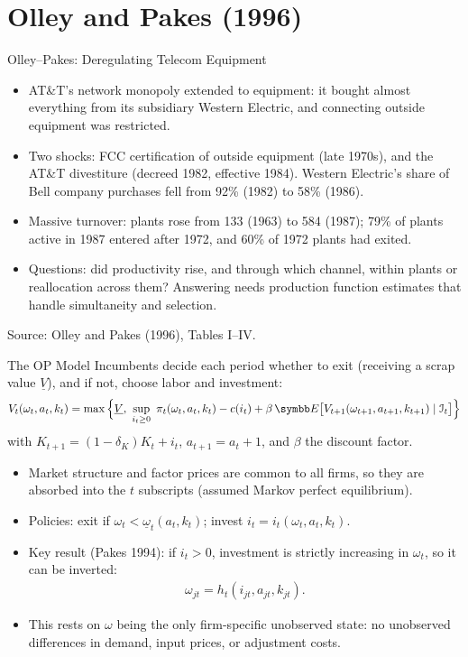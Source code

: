 \documentclass[aspectratio=169,10pt]{beamer}
\begin{document}
\section{Olley and Pakes (1996)}

\begin{frame}{Olley--Pakes: Deregulating Telecom Equipment}
\begin{itemize}
\item AT\&T's network monopoly extended to equipment: it bought almost everything from its subsidiary Western Electric, and connecting outside equipment was restricted.
\item Two shocks: FCC certification of outside equipment (late 1970s), and the AT\&T divestiture (decreed 1982, effective 1984). Western Electric's share of Bell company purchases fell from 92\% (1982) to 58\% (1986).
\item Massive turnover: plants rose from 133 (1963) to 584 (1987); 79\% of plants active in 1987 entered after 1972, and 60\% of 1972 plants had exited.
\item Questions: did productivity rise, and through which channel, within plants or reallocation across them? Answering needs production function estimates that handle \alert{simultaneity} and \alert{selection}.
\end{itemize}
{\footnotesize Source: Olley and Pakes (1996), Tables I--IV.}
\end{frame}


\begin{frame}{The OP Model}
Incumbents decide each period whether to exit (receiving a scrap value $\underline{V}$), and if not, choose labor and investment:
\begin{align*}
V_t(\omega_t, a_t, k_t) = \max\Big\{\underline{V},\ \sup_{i_t \ge 0}\ \pi_t(\omega_t, a_t, k_t) - c(i_t) + \beta\, \E\big[V_{t+1}(\omega_{t+1}, a_{t+1}, k_{t+1}) \mid \mathcal{I}_t\big]\Big\}
\end{align*}
with $K_{t+1} = (1-\delta_K) K_t + i_t$, $a_{t+1} = a_t + 1$, and $\beta$ the discount factor.
\begin{itemize}
\item Market structure and factor prices are common to all firms, so they are absorbed into the $t$ subscripts (assumed Markov perfect equilibrium).
\item Policies: exit if $\omega_t < \underline{\omega}_t(a_t, k_t)$; invest $i_t = i_t(\omega_t, a_t, k_t)$.
\item \alert{Key result} (Pakes 1994): if $i_t > 0$, investment is strictly increasing in $\omega_t$, so it can be inverted:
\begin{align*}
\omega_{jt} = h_t(i_{jt}, a_{jt}, k_{jt}).
\end{align*}
\item This rests on $\omega$ being the \alert{only} firm-specific unobserved state: no unobserved differences in demand, input prices, or adjustment costs.
\end{itemize}
\end{frame}
\end{document}

